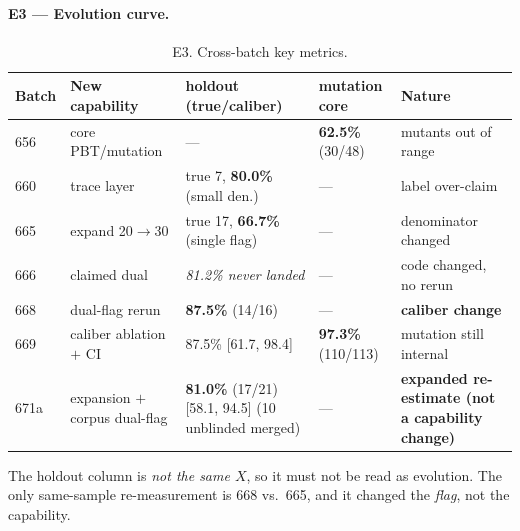 \documentclass{article}
\begin{document}
\paragraph{E3 --- Evolution curve.}
\begin{table}[t]
\caption{E3. Cross-batch key metrics.}
\label{tab:e3}
\centering
\small
\begin{tabular}{@{}llp{3.0cm}lp{3.0cm}@{}}
\toprule
Batch & New capability & holdout (true/caliber) & mutation core & Nature \\
\midrule
656 & core PBT/mutation & --- & \textbf{62.5\%} (30/48) & mutants out of range \\
660 & trace layer & true 7, \textbf{80.0\%} (small den.) & --- & label over-claim \\
665 & expand 20$\to$30 & true 17, \textbf{66.7\%} (single flag) & --- & denominator changed \\
666 & claimed dual & \textit{81.2\% never landed} & --- & code changed, no rerun \\
668 & dual-flag rerun & \textbf{87.5\%} (14/16) & --- & \textbf{caliber change} \\
669 & caliber ablation $+$ CI & 87.5\% [61.7, 98.4] & \textbf{97.3\%} (110/113) & mutation still internal \\
671a & expansion $+$ corpus dual-flag & \textbf{81.0\%} (17/21) [58.1, 94.5] (10 unblinded merged) & --- & \textbf{expanded re-estimate (not a capability change)} \\
\bottomrule
\end{tabular}
\end{table}
The holdout column is \emph{not the same $X$}, so it must not be read as evolution. The only
same-sample re-measurement is 668 vs.\ 665, and it changed the \emph{flag}, not the capability.
\end{document}
